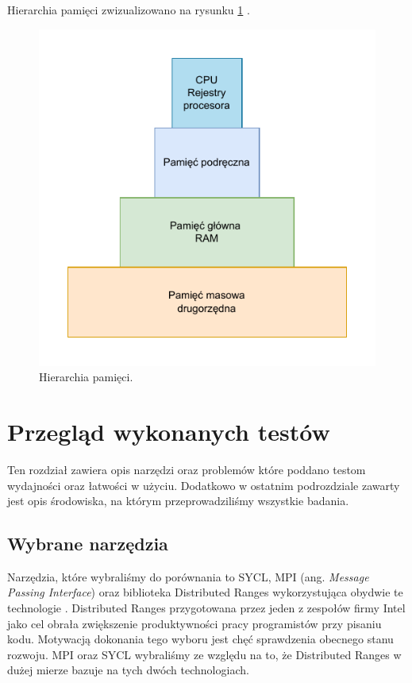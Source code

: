 \documentclass[a4paper,12pt]{book} %
\begin{document}
Hierarchia pamięci zwizualizowano na rysunku \ref{fig:hierarchia_pamieci} \cite{cache-memory}.
\begin{figure}[h]
	\centering
	\includegraphics[scale=1]{assets/hierarchia_pamieci.pdf}
	\caption{Hierarchia pamięci.}
	\label{fig:hierarchia_pamieci}
\end{figure}

\chapter{Przegląd wykonanych testów}
Ten rozdział zawiera opis narzędzi oraz problemów które poddano testom wydajności oraz łatwości w użyciu. Dodatkowo w ostatnim podrozdziale zawarty jest opis środowiska, na którym przeprowadziliśmy wszystkie badania.
\section{Wybrane narzędzia}
Narzędzia, które wybraliśmy do porównania to SYCL, MPI (ang. \emph{Message Passing Interface}) oraz biblioteka Distributed Ranges wykorzystująca obydwie te technologie \cite{SYCL, MPI, dist-ranges}. Distributed Ranges przygotowana przez jeden z zespołów firmy Intel jako cel obrała zwiększenie produktywności pracy programistów przy pisaniu kodu. Motywacją dokonania tego wyboru jest chęć sprawdzenia obecnego stanu rozwoju. MPI oraz SYCL wybraliśmy ze względu na to, że Distributed Ranges w dużej mierze bazuje na tych dwóch technologiach.
\end{document}
